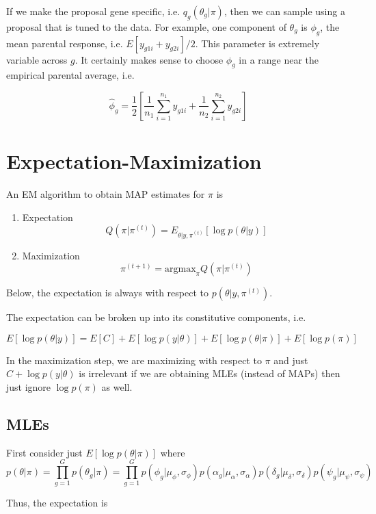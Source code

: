\documentclass{article}
\newcommand{\argmax}{\mbox{argmax}}
\begin{document}
If we make the proposal gene specific, i.e. $q_g(\theta_g|\pi)$, then we can sample using a proposal that is tuned to the data. For example, one component of $\theta_g$ is $\phi_g$, the mean parental response, i.e. $E[y_{g1i}+y_{g2i}]/2$. This parameter is extremely variable across $g$. It certainly makes sense to choose $\phi_g$ in a range near the empirical parental average, i.e. 

\[ \hat{\phi}_g = \frac{1}{2}\left[ \frac{1}{n_1} \sum_{i=1}^{n_1} y_{g1i} + \frac{1}{n_2} \sum_{i=1}^{n_2} y_{g2i} \right] \]


\section{Expectation-Maximization}

An EM algorithm to obtain MAP estimates for $\pi$ is 
\begin{enumerate}
\item Expectation
\[ Q(\pi|\pi^{(t)}) = E_{\theta|y,\pi^{(t)}}[\log p(\theta|y)] \]
\item Maximization
\[ \pi^{(t+1)} = \argmax_{\pi} Q(\pi|\pi^{(t)})  \]
\end{enumerate}

Below, the expectation is always with respect to $p(\theta|y,\pi^{(t)})$. 

The expectation can be broken up into its constitutive components, i.e. 

\[
E[\log p(\theta|y)]= E[C] + E[\log p(y|\theta)] + E[\log p(\theta|\pi)] + E[\log p(\pi)] 
\]

In the maximization step, we are maximizing with respect to $\pi$ and just $C + \log p(y|\theta)$ is irrelevant
if we are obtaining MLEs (instead of MAPs) then just ignore $\log p(\pi)$ as well. 

\subsection{MLEs} 

First consider just $E[\log p(\theta|\pi)]$ where 
\begin{equation}
p(\theta|\pi) = \prod_{g=1}^G p(\theta_g|\pi) = \prod_{g=1}^G p(\phi_g|\mu_\phi, \sigma_\phi) p(\alpha_g|\mu_\alpha, \sigma_\alpha) p(\delta_g|\mu_\delta, \sigma_\delta) p(\psi_g|\mu_\psi, \sigma_\psi) \label{e:theta}
\end{equation}

Thus, the expectation is 
\end{document}
